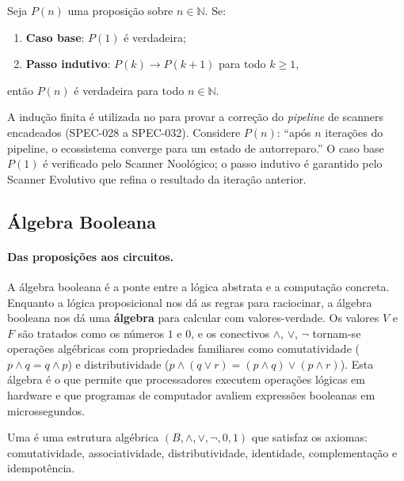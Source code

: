 \begin{definicao}
    Seja $P(n)$ uma proposição sobre $n \in \mathbb{N}$. Se:
    \begin{enumerate}
        \item \textbf{Caso base}: $P(1)$ é verdadeira;
        \item \textbf{Passo indutivo}: $P(k) \to P(k+1)$ para todo $k \geq 1$,
    \end{enumerate}
    então $P(n)$ é verdadeira para todo $n \in \mathbb{N}$.
\end{definicao}

\begin{exemplo}
    A indução finita é utilizada no \opencodeeco{} para provar a correção do
    \textit{pipeline} de scanners encadeados (SPEC-028 a SPEC-032).
    Considere $P(n)$: ``após $n$ iterações do pipeline, o ecossistema
    converge para um estado de autorreparo.''
    O caso base $P(1)$ é verificado pelo Scanner Noológico; o passo indutivo
    é garantido pelo Scanner Evolutivo que refina o resultado da iteração
    anterior.
\end{exemplo}

\subsection{Álgebra Booleana}

\paragraph{Das proposições aos circuitos.} A álgebra booleana é a ponte entre
a lógica abstrata e a computação concreta. Enquanto a lógica proposicional
nos dá as regras para raciocinar, a álgebra booleana nos dá uma
\textbf{álgebra} para calcular com valores-verdade. Os valores $V$ e $F$
são tratados como os números $1$ e $0$, e os conectivos $\land$, $\lor$,
$\neg$ tornam-se operações algébricas com propriedades familiares como
comutatividade ($p \land q = q \land p$) e distributividade
($p \land (q \lor r) = (p \land q) \lor (p \land r)$). Esta álgebra é o que
permite que processadores executem operações lógicas em hardware e que
programas de computador avaliem expressões booleanas em microssegundos.

\begin{definicao}
    Uma  é uma estrutura algébrica
    $(B, \land, \lor, \neg, 0, 1)$ que satisfaz os axiomas: comutatividade,
    associatividade, distributividade, identidade, complementação e
    idempotência.
\end{definicao}

